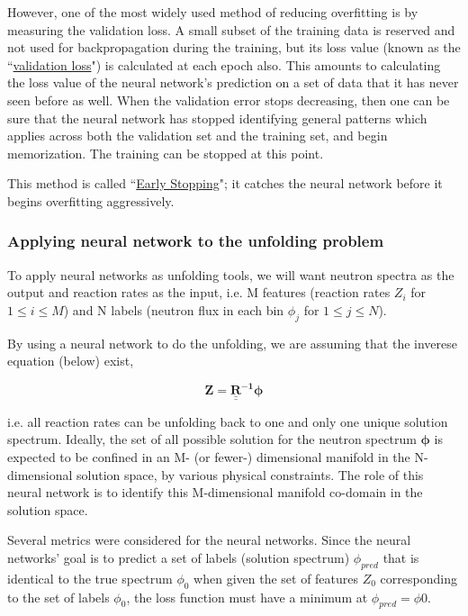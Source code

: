 \documentclass[a4paper, 12pt]{article}
\newcommand{\ve}[1]{\boldsymbol{#1}}
\begin{document}
    However, one of the most widely used method of reducing overfitting is by measuring the validation loss. A small subset of the training data is reserved and not used for backpropagation during the training, but its loss value (known as the ``\underline{validation loss}") is calculated at each epoch also. This amounts to calculating the loss value of the neural network's prediction on a set of data that it has never seen before as well. When the validation error stops decreasing, then one can be sure that the neural network has stopped identifying general patterns which applies across both the validation set and the training set, and begin memorization. The training can be stopped at this point.

    This method is called ``\underline{Early Stopping}"; it catches the neural network before it begins overfitting aggressively.

\subsubsection{Applying neural network to the unfolding problem}
    To apply neural networks as unfolding tools, we will want neutron spectra as the output and reaction rates as the input, i.e. M features (reaction rates $Z_i$ for $1\le i\le M$) and N labels (neutron flux in each bin $\phi_j$ for $1 \le j \le N$).

    By using a neural network to do the unfolding, we are assuming that the inverese equation (below) exist,

    \begin{equation} \label{unfolding inverse equation}
        \ve{Z} = \mathbf{\underline{\underline{R}}^{-1}} \ve{\phi}
    \end{equation}
    
    i.e. all reaction rates can be unfolding back to one and only one unique solution spectrum. Ideally, the set of all possible solution for the neutron spectrum $\ve{\phi}$ is expected to be confined in an M- (or fewer-) dimensional manifold in the N-dimensional solution space, by various physical constraints. The role of this neural network is to identify this M-dimensional manifold co-domain in the solution space. 

    Several metrics were considered for the neural networks. Since the neural networks' goal is to predict a set of labels (solution spectrum) $\phi_{pred}$ that is identical to the true spectrum $\phi_{0}$ when given the set of features $Z_{0}$ corresponding to the set of labels $\phi_{0}$, the loss function must have a minimum at $\phi_{pred}=\phi{0}$.
\end{document}
